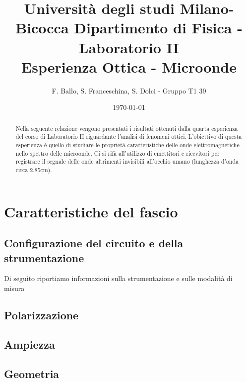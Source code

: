 \documentclass[letterpaper,12pt]{article}
\begin{document}
\title{{\small Università degli studi Milano-Bicocca  Dipartimento di Fisica - Laboratorio II }\\
    Esperienza Ottica - Microonde}
\author{F. Ballo, S. Franceschina, S. Dolci - Gruppo T1 39}
\date{\today}
\maketitle
\thispagestyle{logoheader}


\begin{abstract}
Nella seguente relazione vengono presentati i risultati ottenuti dalla quarta esperienza del corso di Laboratorio II riguardante l'analisi di fenomeni ottici. L'obiettivo di questa esperienza è quello di studiare le proprietà caratteristiche delle onde elettromagnetiche nello spettro delle microonde. Ci si rifà all'utilizzo di emettitori e ricevitori per registrare il segnale delle onde altrimenti invisibili all'occhio umano (lunghezza d'onda circa 2.85cm).  
\begin{adjustwidth}{-1cm}{-1cm}
\end{adjustwidth}
\end{abstract}
\tableofcontents
\newpage

\section{Caratteristiche del fascio}

\subsection{Configurazione del circuito e della strumentazione}
Di seguito riportiamo informazioni sulla strumentazione e sulle modalità di misura
    

\subsection{Polarizzazione}



\subsection{Ampiezza} 



\subsection{Geometria}
\end{document}
